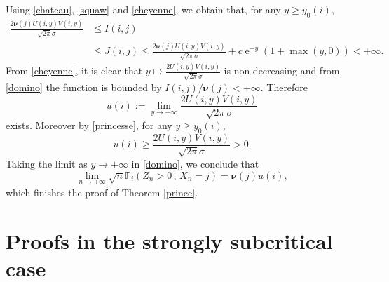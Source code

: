 \documentclass[12pt]{amsart}
\theoremstyle{definition}
\numberwithin{equation}{section}
\def\bb#1{\mathbb{#1}}
\def\bs#1{\boldsymbol{#1}}
\def\geq{\geqslant}
\def\leq{\leqslant}
\DeclareMathOperator{\e}{e}
\begin{document}
Using \eqref{chateau}, \eqref{squaw} and \eqref{cheyenne}, we obtain that, for any $y \geq y_0(i)$,
\begin{align}
	\frac{2\bs \nu(j) U(i,y) V(i,y)}{\sqrt{2\pi}\sigma} &\leq I(i,j) \nonumber\\
	&\leq J(i,j) \leq \frac{2\bs \nu(j) U(i,y) V(i,y)}{\sqrt{2\pi}\sigma} + c \e^{-y}\left(  1+\max(y,0) \right) < +\infty.
	\label{domino}
\end{align}
From \eqref{cheyenne}, it is clear that $y \mapsto \frac{2 U(i,y) V(i,y)}{\sqrt{2\pi}\sigma}$ is non-decreasing and from \eqref{domino} the function is bounded by $I(i,j)/\bs \nu(j) < +\infty$. Therefore
\[
u(i) := \lim_{y\to +\infty} \frac{2 U(i,y) V(i,y)}{\sqrt{2\pi}\sigma}
\]
exists. Moreover by \eqref{princesse}, for any $y \geq y_0(i)$,
\[
u(i) \geq \frac{2 U(i,y) V(i,y)}{\sqrt{2\pi}\sigma} > 0.
\]
Taking the limit as $y \to +\infty$ in \eqref{domino}, we conclude that
\[
\lim_{n \to +\infty} \sqrt{n} \bb P_i \left( Z_n > 0 \,,\, X_n = j \right) = \bs \nu(j) u(i),
\]
which finishes the proof of Theorem \ref{prince}.


\section{Proofs in the strongly subcritical case}
\label{lagon}
\end{document}
